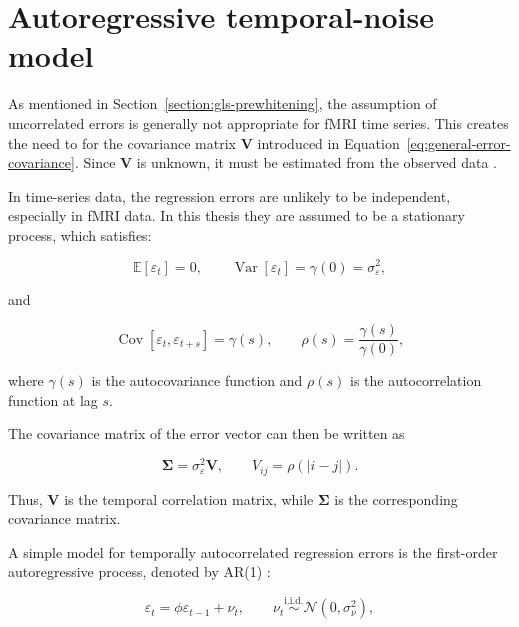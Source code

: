 \section{Autoregressive temporal-noise model}
\label{section:ar-noise-model}

As mentioned in Section~\ref{section:gls-prewhitening}, the assumption of uncorrelated errors is generally not appropriate for fMRI time series. This creates the need to for the covariance matrix $\mathbf{V}$ introduced in Equation~\ref{eq:general-error-covariance}. Since $\mathbf{V}$ is unknown, it must be estimated from the observed data \cite[Chapter 2.7.3]{agresti}.

In time-series data, the regression errors are unlikely to be independent, especially in fMRI data. In this thesis they are assumed to be a stationary process, which satisfies: 

\begin{equation}
    \mathbb{E}\left[\varepsilon_t\right] = 0, \qquad \operatorname{Var}\left[\varepsilon_t\right] = \gamma(0) = \sigma_\varepsilon^2,
\end{equation}

and

\begin{equation} 
    \operatorname{Cov} \left[\varepsilon_t, \varepsilon_{t+s} \right] = \gamma(s), \qquad \rho(s) = \frac{\gamma(s)}{\gamma(0)},
    \label{eq:error-autocorrelation}
\end{equation}

where $\gamma(s)$ is the autocovariance function and $\rho(s)$ is the autocorrelation function at lag $s$.

The covariance matrix of the error vector can then be written as

\begin{equation}
    \boldsymbol{\Sigma} = \sigma_\varepsilon^2\mathbf{V}, \qquad V_{ij} = \rho(|i-j|).
    \label{eq:stationary-error-covariance}
\end{equation}

Thus, $\mathbf{V}$ is the temporal correlation matrix, while $\boldsymbol{\Sigma}$ is the corresponding covariance matrix.

A simple model for temporally autocorrelated regression errors is the first-order autoregressive process, denoted by AR(1) \cite{ols-ar-connection}:

\begin{equation}
    \varepsilon_t = \phi\varepsilon_{t-1} + \nu_t, \qquad \nu_t \overset{\mathrm{i.i.d.}}{\sim} \mathcal{N} \left(0, \sigma_\nu^2 \right),
    \label{eq:ar1-error-model}
\end{equation}

